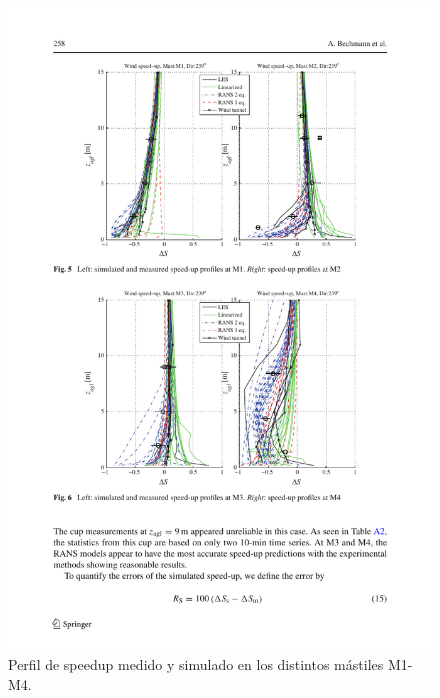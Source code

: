\begin{figure}[H]
	\includegraphics[width=1.0\linewidth,trim={2.7cm 6.0cm 1.9cm 10.3cm},clip]{bolund3.pdf}%
	\caption{Perfil de speedup medido y simulado en los distintos mástiles M1-M4.}
	\label{fig:an1_speed_masts}
\end{figure}
\vspace*{\fill}
\newpage
\vspace*{\fill}
